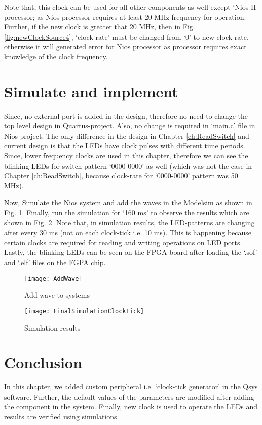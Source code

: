 \begin{noNumBox}
	Note that, this clock can be used for all other components as well except `Nios II processor; as Nios processor requires at least 20 MHz frequency for operation. Further, if the new clock is greater that 20 MHz, then in Fig. \ref{fig:newClockSource4}, `clock rate' must be changed from `0' to new clock rate, otherwise it will generated error for Nios processor as processor requires exact knowledge of the clock frequency.
\end{noNumBox}
\section{Simulate and implement}
Since, no external port is added in the design, therefore no need to change the top level design in Quartus-project. Also, no change is required in `main.c' file in Nios project. The only difference in the design in Chapter \ref{ch:ReadSwitch} and current design is that the LEDs have clock pulses with different time periods. Since, lower frequency clocks are used in this chapter, therefore we can see the blinking LEDs for switch pattern `0000-0000' as well (which was not the case in Chapter \ref{ch:ReadSwitch}, because clock-rate for `0000-0000' pattern was 50 MHz).

Now, Simulate the Nios system and add the waves in the Modelsim as shown in Fig. \ref {fig:AddWave}. Finally, run the simulation for `160 ms' to observe the results which are shown in Fig. \ref{fig:FinalSimulationClockTick}. Note that, in simulation results, the LED-patterns are changing after every 30 ms (not on each clock-tick i.e. 10 ms). This is happening because certain clocks are required for reading and writing operations on LED ports. Lastly, the blinking LEDs can be seen on the FPGA board after loading the `.sof' and `.elf' files on the FGPA chip. 

\begin{figure}[!h]
	\centering
	\texttt{[image: AddWave]}
	\caption{Add wave to systems}
	\label{fig:AddWave}
\end{figure}

\begin{figure}[!h]
	\centering
	\texttt{[image: FinalSimulationClockTick]}
	\caption{Simulation results}
	\label{fig:FinalSimulationClockTick}
\end{figure}

\section{Conclusion}
In this chapter, we added custom peripheral i.e. `clock-tick generator' in the Qsys software. Further, the default values of the parameters are modified after adding the component in the system. Finally, new clock is used to operate the LEDs and results are verified using simulations.  
